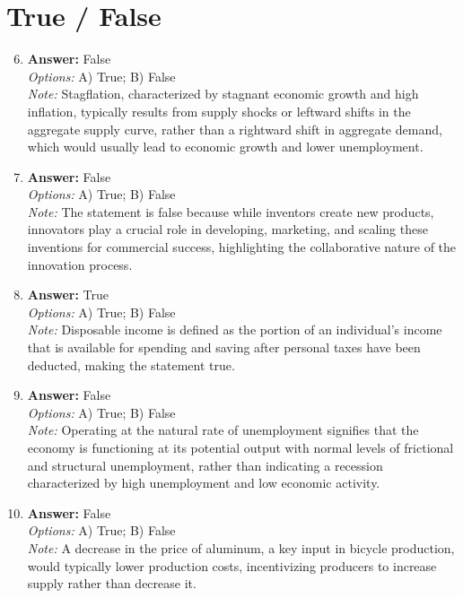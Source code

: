 \documentclass[12pt]{article}
\begin{document}
\section*{True / False}
\begin{enumerate}[label=\arabic*.]
\setcounter{enumi}{5}
\item \textbf{Answer:} False
\\ \textit{Options:} A) True; B) False
\\ \textit{Note:} Stagflation, characterized by stagnant economic growth and high inflation, typically results from supply shocks or leftward shifts in the aggregate supply curve, rather than a rightward shift in aggregate demand, which would usually lead to economic growth and lower unemployment.
\item \textbf{Answer:} False
\\ \textit{Options:} A) True; B) False
\\ \textit{Note:} The statement is false because while inventors create new products, innovators play a crucial role in developing, marketing, and scaling these inventions for commercial success, highlighting the collaborative nature of the innovation process.
\item \textbf{Answer:} True
\\ \textit{Options:} A) True; B) False
\\ \textit{Note:} Disposable income is defined as the portion of an individual's income that is available for spending and saving after personal taxes have been deducted, making the statement true.
\item \textbf{Answer:} False
\\ \textit{Options:} A) True; B) False
\\ \textit{Note:} Operating at the natural rate of unemployment signifies that the economy is functioning at its potential output with normal levels of frictional and structural unemployment, rather than indicating a recession characterized by high unemployment and low economic activity.
\item \textbf{Answer:} False
\\ \textit{Options:} A) True; B) False
\\ \textit{Note:} A decrease in the price of aluminum, a key input in bicycle production, would typically lower production costs, incentivizing producers to increase supply rather than decrease it.
\end{enumerate}
\end{document}
